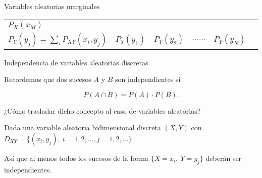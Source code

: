 \documentclass[ignorenonframetext,]{beamer}
\begin{document}
\begin{frame}{Variables aleatorias marginales}
\begin{longtable}[]{@{}lrrrrc@{}}
\begin{minipage}[t]{0.14\columnwidth}
\(P_X(x_M)\)\strut
\end{minipage}\tabularnewline
\begin{minipage}[t]{0.11\columnwidth}\raggedright
\(P_Y(y_j)=\displaystyle\sum_i P_{XY}(x_i,y_j)\)\strut
\end{minipage} & \begin{minipage}[t]{0.14\columnwidth}\raggedleft
\(P_Y(y_1)\)\strut
\end{minipage} & \begin{minipage}[t]{0.14\columnwidth}\raggedleft
\(P_Y(y_2)\)\strut
\end{minipage} & \begin{minipage}[t]{0.14\columnwidth}\raggedleft
\(\ldots\ldots\)\strut
\end{minipage} & \begin{minipage}[t]{0.14\columnwidth}\raggedleft
\(P_Y(y_N)\)\strut
\end{minipage} & \begin{minipage}[t]{0.14\columnwidth}\centering
1\strut
\end{minipage}\tabularnewline
\bottomrule
\end{longtable}

\end{frame}

\begin{frame}{Independencia de variables aleatorias discretas}
\protect\hypertarget{independencia-de-variables-aleatorias-discretas}{}

Recordemos que dos sucesos \(A\) y \(B\) son independientes si

\[P(A\cap B)=P(A)\cdot P(B).\]

¿Cómo trasladar dicho concepto al caso de variables aleatorias?

Dada una variable aleatoria bidimensional discreta \((X,Y)\) con
\(D_{XY}=\{(x_i,y_j),\ i=1,2,\ldots,j=1,2,\ldots\}\)

Así que al menos todos los sucesos de la forma \(\{X=x_i,\  Y=y_j\}\)
deberán ser independientes.

\end{frame}
\end{document}
